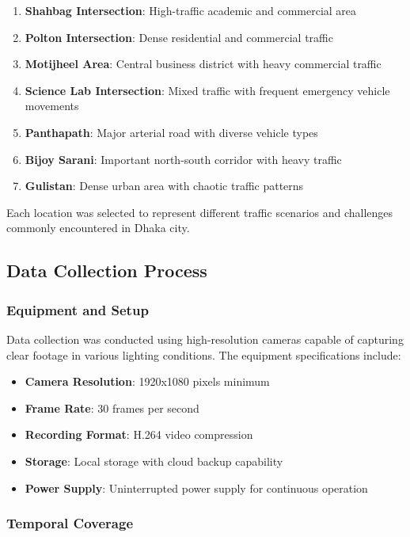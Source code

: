 \begin{enumerate}
    \item \textbf{Shahbag Intersection}: High-traffic academic and commercial area
    \item \textbf{Polton Intersection}: Dense residential and commercial traffic
    \item \textbf{Motijheel Area}: Central business district with heavy commercial traffic
    \item \textbf{Science Lab Intersection}: Mixed traffic with frequent emergency vehicle movements
    \item \textbf{Panthapath}: Major arterial road with diverse vehicle types
    \item \textbf{Bijoy Sarani}: Important north-south corridor with heavy traffic
    \item \textbf{Gulistan}: Dense urban area with chaotic traffic patterns
\end{enumerate}

Each location was selected to represent different traffic scenarios and challenges commonly encountered in Dhaka city.

\subsection{Data Collection Process}

\subsubsection{Equipment and Setup}

Data collection was conducted using high-resolution cameras capable of capturing clear footage in various lighting conditions. The equipment specifications include:

\begin{itemize}
    \item \textbf{Camera Resolution}: 1920x1080 pixels minimum
    \item \textbf{Frame Rate}: 30 frames per second
    \item \textbf{Recording Format}: H.264 video compression
    \item \textbf{Storage}: Local storage with cloud backup capability
    \item \textbf{Power Supply}: Uninterrupted power supply for continuous operation
\end{itemize}

\subsubsection{Temporal Coverage}

